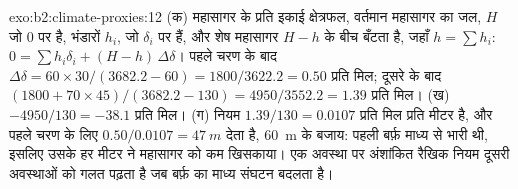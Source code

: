 \begin{solution}{exo:b2:climate-proxies:12}
(क) महासागर के प्रति इकाई क्षेत्रफल, वर्तमान महासागर का जल, $H$ जो 0 पर है, भंडारों
$h_i$, जो $\delta_i$ पर हैं, और शेष महासागर $H - h$ के बीच बँटता है, जहाँ $h = \sum h_i$: $0 = \sum h_i\delta_i +
(H - h)\,\Delta\delta$। पहले चरण के बाद $\Delta\delta = 60 \times 30/(3682.2 - 60) =
1800/3622.2 = 0.50$ प्रति मिल; दूसरे के बाद $(1800 + 70 \times 45)/(3682.2 - 130) =
4950/3552.2 = 1.39$ प्रति मिल। (ख) $-4950/130 = -38.1$ प्रति मिल। (ग) नियम $1.39/130 = 0.0107$
प्रति मिल प्रति मीटर है, और पहले चरण के लिए $0.50/0.0107 = \qty{47}{m}$ देता है, \qty{60}{m} के
बजाय: पहली बर्फ़ माध्य से भारी थी, इसलिए उसके हर मीटर ने महासागर को
कम खिसकाया। एक अवस्था पर अंशांकित रैखिक नियम दूसरी अवस्थाओं को गलत पढ़ता है जब
बर्फ़ का माध्य संघटन बदलता है।
\end{solution}

